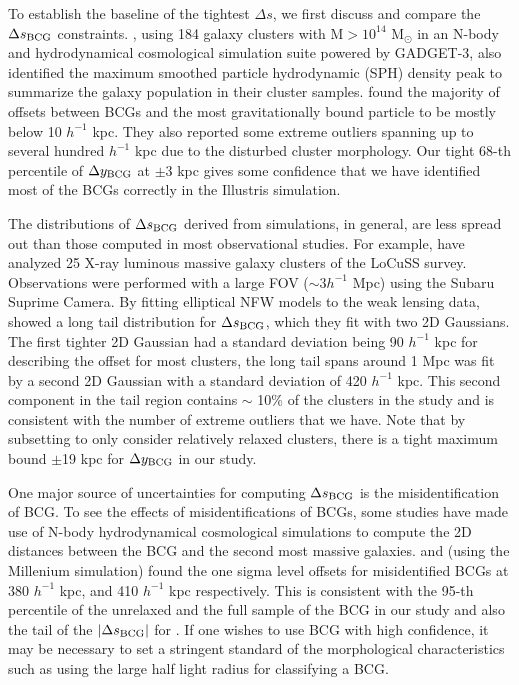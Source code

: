 To establish the baseline of the tightest $\Delta s$, we first discuss and 
compare the $\Delta s_{\rm BCG}$ constraints.   
\cite{Cui2015}, using 184 galaxy clusters with M$ > 10^{14}$ M$_\odot$ in an
N-body and hydrodynamical cosmological simulation suite powered by GADGET-3, 
also identified the maximum smoothed particle hydrodynamic (SPH) density peak
to summarize 
the galaxy population in their cluster samples. \cite{Cui2015} found
the majority of offsets between BCGs and the most gravitationally bound particle to be
mostly below 10 $h^{-1}$ kpc. They also reported some extreme outliers 
spanning up to several hundred $h^{-1}$ kpc due to the disturbed cluster morphology. Our 
tight 68-th percentile of 
$\Delta y_{\rm BCG}$ at $ \pm 3$ kpc gives some confidence that 
we have identified most of the BCGs correctly in the Illustris simulation.

The distributions of $\Delta s_{\rm BCG}$ derived from simulations, in general, 
are less spread out than those computed in most observational studies.
For example, \cite{Oguri2010} have analyzed 25 X-ray luminous 
massive galaxy clusters of the LoCuSS survey. 
Observations were performed with a large FOV ($\sim 3 h^{-1}$ Mpc) 
using the Subaru Suprime Camera. 
By fitting elliptical NFW models to the weak lensing data, \cite{Oguri2010}
showed a long tail
 distribution for $\Delta s_{\rm BCG}$, which they fit with two 2D Gaussians.
The first tighter 2D Gaussian had a standard deviation being 90
$h^{-1}$ kpc for describing the
offset for most clusters, the long tail spans around 1 Mpc was fit by a second 2D
Gaussian with a standard deviation of 420 $h^{-1}$ kpc. This second component
in the tail region contains $\sim$ 10\% of the clusters in the study and is
consistent with the number of extreme outliers that we have.   
Note that by subsetting to only consider relatively relaxed clusters, 
there is a tight maximum bound $\pm$19 kpc for $\Delta y_{\rm BCG}$ in our study. 

One major source of uncertainties for computing $\Delta s_{\rm BCG}$ is the
misidentification of BCG.
To see the effects of misidentifications of 
BCGs, some studies have made use of N-body hydrodynamical cosmological
simulations to compute the 2D distances between the BCG and 
the second most massive galaxies. \cite{Johnston2007b} and 
\cite{Hilbert2010} (using the Millenium simulation)  found 
the one sigma level offsets for misidentified BCGs at 380 $h^{-1}$ kpc, and 410 
$h^{-1}$ kpc respectively. This is consistent with the 95-th percentile of the
unrelaxed and the full sample of the BCG in our study and also the tail of the
$|\Delta s_{\rm BCG}|$ for \cite{Cui2015}. If one wishes to use BCG with high
confidence, it may be necessary to set a stringent standard of the morphological
characteristics such as using the large half light radius for classifying a BCG.

